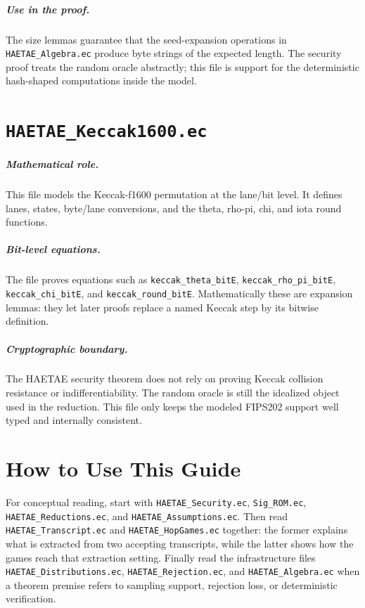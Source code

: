 \documentclass[11pt]{report}
\newcommand{\file}[1]{\nolinkurl{#1}}
\newcommand{\ec}[1]{\nolinkurl{#1}}
\newcommand{\ecchapter}[2]{\chapter{\texorpdfstring{\texttt{#1}}{#2}}}
\theoremstyle{definition}
\theoremstyle{plain}
\theoremstyle{definition}
\begin{document}
\paragraph{Use in the proof.}
The size lemmas guarantee that the seed-expansion operations in
\file{HAETAE_Algebra.ec} produce byte strings of the expected length.  The
security proof treats the random oracle abstractly; this file is support for
the deterministic hash-shaped computations inside the model.



\ecchapter{HAETAE\_Keccak1600.ec}{HAETAE Keccak1600.ec}

\paragraph{Mathematical role.}
This file models the Keccak-f1600 permutation at the lane/bit level.  It
defines lanes, states, byte/lane conversions, and the theta, rho-pi, chi, and
iota round functions.

\paragraph{Bit-level equations.}
The file proves equations such as \ec{keccak_theta_bitE},
\ec{keccak_rho_pi_bitE}, \ec{keccak_chi_bitE}, and
\ec{keccak_round_bitE}.  Mathematically these are expansion lemmas: they let
later proofs replace a named Keccak step by its bitwise definition.

\paragraph{Cryptographic boundary.}
The HAETAE security theorem does not rely on proving Keccak collision
resistance or indifferentiability.  The random oracle is still the idealized
object used in the reduction.  This file only keeps the modeled FIPS202 support
well typed and internally consistent.



\chapter*{How to Use This Guide}

For conceptual reading, start with \file{HAETAE_Security.ec},
\file{Sig_ROM.ec}, \file{HAETAE_Reductions.ec}, and
\file{HAETAE_Assumptions.ec}.  Then read \file{HAETAE_Transcript.ec} and
\file{HAETAE_HopGames.ec} together: the former explains what is extracted from
two accepting transcripts, while the latter shows how the games reach that
extraction setting.  Finally read the infrastructure files
\file{HAETAE_Distributions.ec}, \file{HAETAE_Rejection.ec}, and
\file{HAETAE_Algebra.ec} when a theorem premise refers to sampling support,
rejection loss, or deterministic verification.
\end{document}
